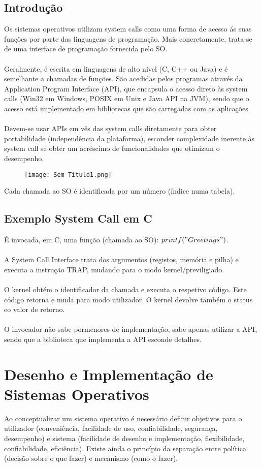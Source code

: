 \documentclass[10pt,a4paper]{report}
\begin{document}
\subsection{Introdução}
Os sistemas operativos utilizam system calls como uma forma de acesso ás suas funções por parte das linguagens de programação. Mais concretamente, trata-se de uma interface de programação fornecida pelo SO.\\
\\
Geralmente, é escrita em linguagens de alto nível (C, C++ ou Java) e é semelhante a chamadas de funções. São acedidas pelos programas através da Application Program Interface (API), que encapsula o acesso direto às system calls (Win32 em Windows, POSIX em Unix e Java API na JVM), sendo que o acesso está implementado em bibliotecas que são carregadas com as aplicações.\\
\\
Devem-se usar APIs em vês das system calls diretamente para obter portabilidade (independência da plataforma), esconder complexidade inerente às system call se obter um acréscimo de funcionalidades que otimizam o desempenho.
\begin{figure}[H]
\centering
\texttt{[image: Sem Título1.png]}
\end{figure}
Cada chamada ao SO é identificada por um número (índice numa tabela).
\subsection{Exemplo System Call em C}
É invocada, em C, uma função (chamada ao SO): $printf("Greetings")$.\\
\\
A System Call Interface trata dos argumentos (registos, memória e pilha) e executa a instrução TRAP, mudando para o modo kernel/previligiado.\\
\\
O kernel obtém o identificador da chamada e executa o respetivo código. Este código retorna e muda para modo utilizador. O kernel devolve também o status eo valor de retorno.\\
\\
O invocador não sabe pormenores de implementação, sabe apenas utilizar a API, sendo que a biblioteca que implementa a API esconde detalhes.
\section{Desenho e Implementação de Sistemas Operativos}
Ao conceptualizar um sistema operativo é necessário definir objetivos para o utilizador (conveniência, facilidade de uso, confiabilidade, segurança, desempenho) e sistema (facilidade de desenho e implementação, flexibilidade, confiabilidade, eficiência). Existe ainda o princípio da separação entre política (decisão sobre o que fazer) e mecanismo (como o fazer).
\end{document}
